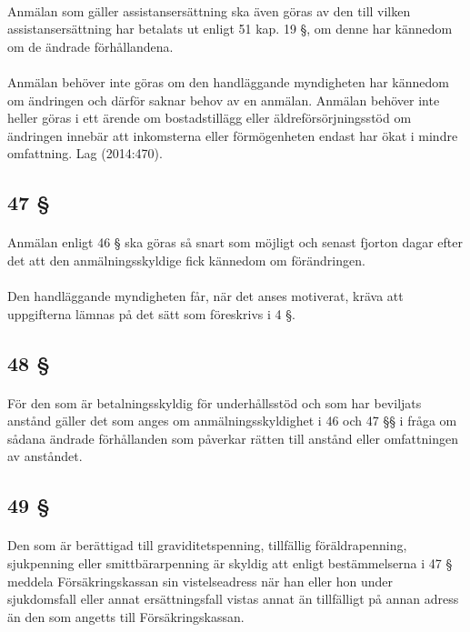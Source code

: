 \documentclass[a4paper,notitlepage,openany,10pt]{book}
\begin{document}
\paragraph*{}
Anmälan som gäller assistansersättning ska även göras av den till vilken assistansersättning har betalats ut enligt 51 kap. 19 §, om denne har kännedom om de ändrade förhållandena.
\paragraph*{}
Anmälan behöver inte göras om den handläggande myndigheten har kännedom om ändringen och därför saknar behov av en anmälan. Anmälan behöver inte heller göras i ett ärende om bostadstillägg eller äldreförsörjningsstöd om ändringen innebär att inkomsterna eller förmögenheten endast har ökat i mindre omfattning.
Lag (2014:470).
\subsection*{47 §}
\paragraph*{}
Anmälan enligt 46 § ska göras så snart som möjligt och senast fjorton dagar efter det att den anmälningsskyldige fick kännedom om förändringen.
\paragraph*{}
Den handläggande myndigheten får, när det anses motiverat, kräva att uppgifterna lämnas på det sätt som föreskrivs i 4 §.
\subsection*{48 §}
\paragraph*{}
För den som är betalningsskyldig för underhållsstöd och som har beviljats anstånd gäller det som anges om anmälningsskyldighet i 46 och 47 §§ i fråga om sådana ändrade förhållanden som påverkar rätten till anstånd eller omfattningen av anståndet.
\subsection*{49 §}
\paragraph*{}
Den som är berättigad till graviditetspenning, tillfällig föräldrapenning, sjukpenning eller smittbärarpenning är skyldig att enligt bestämmelserna i 47 § meddela Försäkringskassan sin vistelseadress när han eller hon under sjukdomsfall eller annat ersättningsfall vistas annat än tillfälligt på annan adress än den som angetts till Försäkringskassan.
\end{document}
